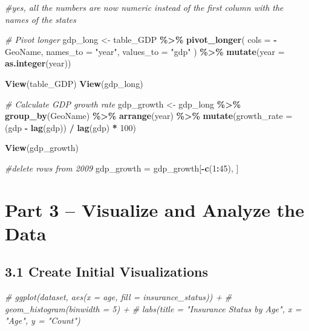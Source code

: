 \documentclass[
]{article}
\newenvironment{Shaded}{\begin{snugshade}}{\end{snugshade}}
\newcommand{\AttributeTok}[1]{\textcolor[rgb]{0.13,0.29,0.53}{#1}}
\newcommand{\CommentTok}[1]{\textcolor[rgb]{0.56,0.35,0.01}{\textit{#1}}}
\newcommand{\DecValTok}[1]{\textcolor[rgb]{0.00,0.00,0.81}{#1}}
\newcommand{\FunctionTok}[1]{\textcolor[rgb]{0.13,0.29,0.53}{\textbf{#1}}}
\newcommand{\NormalTok}[1]{#1}
\newcommand{\OtherTok}[1]{\textcolor[rgb]{0.56,0.35,0.01}{#1}}
\newcommand{\SpecialCharTok}[1]{\textcolor[rgb]{0.81,0.36,0.00}{\textbf{#1}}}
\newcommand{\StringTok}[1]{\textcolor[rgb]{0.31,0.60,0.02}{#1}}
\begin{document}
\begin{Shaded}
\begin{Highlighting}[]
\CommentTok{\#yes, all the numbers are now numeric instead of the first column with the names of the states}


\CommentTok{\# Pivot longer}
\NormalTok{gdp\_long }\OtherTok{\textless{}{-}}\NormalTok{ table\_GDP }\SpecialCharTok{\%\textgreater{}\%}
  \FunctionTok{pivot\_longer}\NormalTok{(}
    \AttributeTok{cols =} \SpecialCharTok{{-}}\NormalTok{GeoName,}
    \AttributeTok{names\_to =} \StringTok{"year"}\NormalTok{,}
    \AttributeTok{values\_to =} \StringTok{"gdp"}
\NormalTok{  ) }\SpecialCharTok{\%\textgreater{}\%}
  \FunctionTok{mutate}\NormalTok{(}\AttributeTok{year =} \FunctionTok{as.integer}\NormalTok{(year))}

\FunctionTok{View}\NormalTok{(table\_GDP)}
\FunctionTok{View}\NormalTok{(gdp\_long)}

\CommentTok{\# Calculate GDP growth rate}
\NormalTok{gdp\_growth }\OtherTok{\textless{}{-}}\NormalTok{ gdp\_long }\SpecialCharTok{\%\textgreater{}\%}
  \FunctionTok{group\_by}\NormalTok{(GeoName) }\SpecialCharTok{\%\textgreater{}\%}
  \FunctionTok{arrange}\NormalTok{(year) }\SpecialCharTok{\%\textgreater{}\%}
  \FunctionTok{mutate}\NormalTok{(}\AttributeTok{growth\_rate =}\NormalTok{ (gdp }\SpecialCharTok{{-}} \FunctionTok{lag}\NormalTok{(gdp)) }\SpecialCharTok{/} \FunctionTok{lag}\NormalTok{(gdp) }\SpecialCharTok{*} \DecValTok{100}\NormalTok{)}

\FunctionTok{View}\NormalTok{(gdp\_growth)}

\CommentTok{\#delete rows from 2009}
\NormalTok{gdp\_growth }\OtherTok{=}\NormalTok{ gdp\_growth[}\SpecialCharTok{{-}}\FunctionTok{c}\NormalTok{(}\DecValTok{1}\SpecialCharTok{:}\DecValTok{45}\NormalTok{), ]}
\end{Highlighting}
\end{Shaded}

\section{Part 3 -- Visualize and Analyze the
Data}\label{part-3-visualize-and-analyze-the-data}

\subsection{3.1 Create Initial
Visualizations}\label{create-initial-visualizations}

\begin{Shaded}
\begin{Highlighting}[]
\CommentTok{\# ggplot(dataset, aes(x = age, fill = insurance\_status)) +}
\CommentTok{\#   geom\_histogram(binwidth = 5) +}
\CommentTok{\#   labs(title = "Insurance Status by Age", x = "Age", y = "Count")}
\end{Highlighting}
\end{Shaded}
\end{document}
